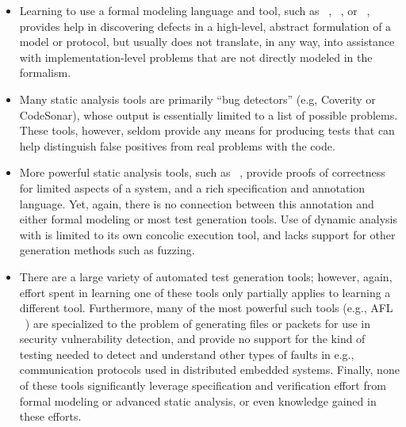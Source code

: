 \begin{itemize}
\item Learning to use a formal modeling language and tool, such as \uppaal~\cite{uppaal}, \prism~\cite{KNP2011:CAV}, or \spin~\cite{SPIN}, provides help in discovering defects in a high-level, abstract formulation of a model or protocol, but usually does not translate, in any way, into assistance with implementation-level problems that are not directly modeled in the formalism.
\item Many static analysis tools are primarily ``bug detectors'' (e.g, Coverity or CodeSonar), whose output is essentially limited to a list of possible problems.  These tools, however, seldom provide any means for producing tests that can help distinguish false positives from real problems with the code.
\item More powerful static analysis tools, such as \framac~\cite{KKP2015:FAC}, provide proofs of correctness for limited aspects of a system, and a rich specification and annotation language.  Yet, again, there is no connection between this annotation and either formal modeling or most test generation tools.  Use of dynamic analysis with \framac is limited to its own concolic execution tool, and lacks support for other generation methods such as fuzzing.
\item There are a large variety of automated test generation tools; however, again, effort spent in learning one of these tools only partially applies to learning a different tool.  Furthermore, many of the most powerful such tools (e.g., AFL ~\cite{aflfuzz}) are specialized to the problem of generating files or packets for use in security vulnerability detection, and provide no support for  the kind of testing needed to detect and understand other types of faults in e.g., communication protocols used in distributed embedded systems.  Finally, none of these tools significantly leverage specification and verification effort from formal modeling or advanced static analysis, or even knowledge gained in these efforts.
\end{itemize}


